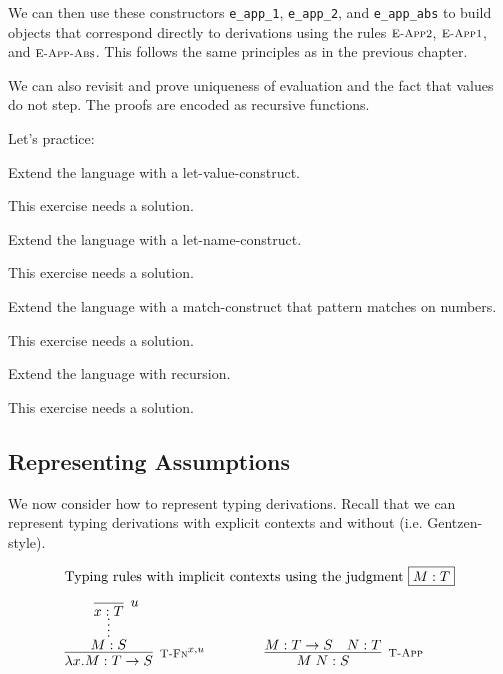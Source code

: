 We can then use these constructors \lstinline!e_app_1!,
\lstinline!e_app_2!, and \lstinline!e_app_abs! to build objects that
correspond directly to derivations using the rules $\textsc{\footnotesize E-App2}$,
$\textsc{\footnotesize E-App1}$, and  $\textsc{\footnotesize E-App-Abs}$. This follows the same principles as in the
previous chapter.

We can also revisit and prove uniqueness of evaluation and the fact that values
do not step. The proofs are encoded as recursive functions.

Let's practice:

\begin{Exercise}
Extend the language with a let-value-construct.
\end{Exercise}
\begin{Answer}
This exercise needs a solution.
\end{Answer}

\begin{Exercise}
Extend the language with a let-name-construct.
\end{Exercise}
\begin{Answer}
This exercise needs a solution.
\end{Answer}

\begin{Exercise}
Extend the language with a match-construct that pattern matches on numbers.
\end{Exercise}
\begin{Answer}
This exercise needs a solution.
\end{Answer}

\begin{Exercise}
Extend the language with recursion.
\end{Exercise}
\begin{Answer}
This exercise needs a solution.
\end{Answer}



\subsection{Representing Assumptions }\label{sec:HOAS-Assumptions}
We now consider how to represent typing derivations. Recall that we can
represent typing derivations with explicit contexts and without
(i.e. Gentzen-style).

\[
\begin{array}{c@{\qquad}c}
\multicolumn{2}{l}{\mbox{Typing rules with implicit contexts using the judgment \fbox{$M:T$}}} \\[1em]
\infer[\TFn^{x,u}]{\lam x.M : T \arrow S}
                 {\infer*{M:S}{\infer[u]{x:T}{}}} &
\infer[\TApp]{M\;N : S}{M : T \arrow S & N:T}
\end{array}
\]


